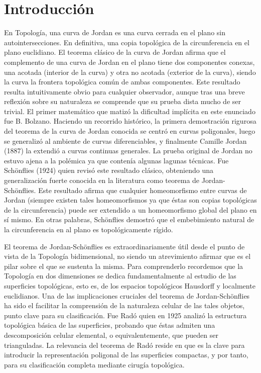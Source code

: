 \documentclass[12pt,a4paper,oldfontcommands]{memoir}
\begin{document}
\chapter*{Introducción}
En Topología, una curva de Jordan es una curva cerrada en el plano sin autointersecciones. En definitiva, una copia topológica de la circunferencia en el plano euclidiano. El teorema clásico de la curva de Jordan  afirma que el complemento de una curva de Jordan en el plano tiene dos componentes conexas, una acotada (interior de la curva) y otra no acotada   (exterior de la curva), siendo la curva la frontera topológica común  de ambas componentes. Este resultado resulta intuitivamente obvio para cualquier observador, aunque tras una breve reflexión sobre su naturaleza se comprende  que su prueba dista mucho de ser trivial. El primer matemático que matizó la dificultad implícita en este enunciado fue B. Bolzano. Haciendo un recorrido histórico, la primera demostración rigurosa del teorema de la curva de Jordan conocida se centró en curvas poligonales, luego se generalizó al ambiente de curvas diferenciables, y finalmente   Camille Jordan (1887) la extendió a curvas continuas generales. La prueba original de Jordan no estuvo ajena a la polémica ya que contenía algunas lagunas técnicas. Fue Schönflies (1924) quien  revisó este resultado clásico,  obteniendo una generalización fuerte conocida en la literatura como teorema de Jordan-Schönflies. Este resultado afirma que cualquier homeomorfismo entre   curvas de Jordan (siempre existen tales homeomorfismos ya que   éstas son copias topológicas de la circunferencia) puede ser extendido a un homeomorfismo global del plano en sí mismo. En otras palabras, Schönflies demostró que el embebimiento natural de la circunferencia en al plano es topológicamente rígido. 

El teorema de Jordan-Schönflies es extraordinariamente útil desde el punto de vista de la Topología bidimensional, no siendo un atrevimiento  afirmar que es el pilar sobre el que se sustenta la misma. 
Para comprenderlo recordemos que la Topología en dos dimensiones se dedica fundamentalmente al estudio de las superficies topológicas, esto es, de los espacios topológicos  Hausdorff y localmente euclidianos.  Una de las implicaciones cruciales del teorema de Jordan-Schönflies  ha sido el facilitar la comprensión de la naturaleza celular de las tales objetos, punto clave para su clasificación. Fue Radó quien en 1925  analizó la estructura topológica básica de las superficies, probando que  éstas admiten una descomposición celular elemental, o equivalentemente, que pueden ser  trianguladas. La relevancia del teorema de Radó  reside en que  es la clave para introducir la representación poligonal de las superficies compactas, y por tanto, para  su clasificación completa mediante cirugía topológica.
\end{document}
